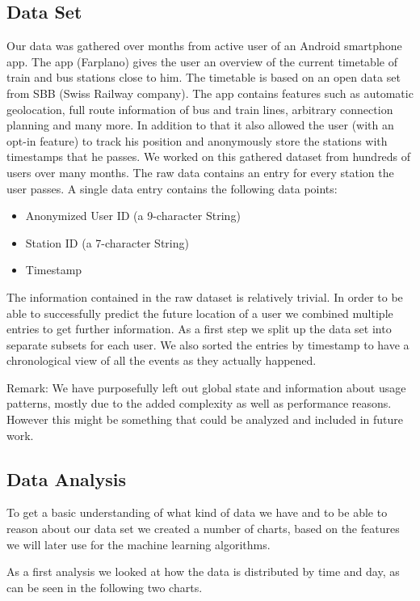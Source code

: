 \subsection{Data Set}
Our data was gathered over months from active user of an Android smartphone app. The app (Farplano) gives the user an overview of the current timetable of train and bus stations close to him. The timetable is based on an open data set from SBB (Swiss Railway company). The app contains features such as automatic geolocation, full route information of bus and train lines, arbitrary connection planning and many more. In addition to that it also allowed the user (with an opt-in feature) to track his position and anonymously store the stations with timestamps that he passes. We worked on this gathered dataset from hundreds of users over many months. The raw data contains an entry for every station the user passes. A single data entry contains the following data points:
\begin{itemize}
	\item Anonymized User ID (a 9-character String)
	\item Station ID (a 7-character String)
	\item Timestamp
\end{itemize}
The information contained in the raw dataset is relatively trivial. In order to be able to successfully predict the future location of a user we combined multiple entries to get further information. As a first step we split up the data set into separate subsets for each user. We also sorted the entries by timestamp to have a chronological view of all the events as they actually happened.

Remark: We have purposefully left out global state and information about usage patterns, mostly due to the added complexity as well as performance reasons. However this might be something that could be analyzed and included in future work. 

\subsection{Data Analysis}
To get a basic understanding of what kind of data we have and to be able to reason about our data set we created a number of charts, based on the features we will later use for the machine learning algorithms. 

As a first analysis we looked at how the data is distributed by time and day, as can be seen in the following two charts.

